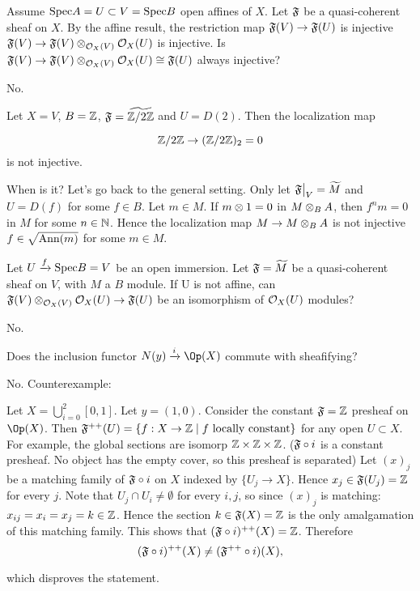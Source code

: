 \begin{question}
Assume $\Spec A = U \subset V = \Spec B$ open affines of $X$.
Let $\mathfrak{F}$ be a quasi-coherent sheaf on $X$.
By the affine result, the restriction map $\mathfrak{F}(V) \rightarrow \mathfrak{F}(U)$ is injective \iff $\mathfrak{F}(V) \rightarrow \mathfrak{F}(V)\otimes_{\mathcal{O}_X(V)}\mathcal{O}_X(U)$ is injective.
Is $\mathfrak{F}(V) \rightarrow \mathfrak{F}(V)\otimes_{\mathcal{O}_X(V)} \mathcal{O}_X(U) \cong \mathfrak{F}(U)$ always injective?
\end{question}
\begin{Qanswer}
No.

Let $X=V$, $B= \mathbb{Z}$, $\mathfrak{F}= \widetilde{\mathbb{Z}/2\mathbb{Z}}$ and $U= D(2)$.
Then the localization map 

\[ \mathbb{Z}/2\mathbb{Z} \rightarrow (\mathbb{Z}/2\mathbb{Z})_2 = 0\]
is not injective. 

\bigskip
When is it?
Let's go back to the general setting. 
Only let $\restr{\shf}{V}= \widetilde{M}$ and $U= D(f)$ for some $f \in B$.
Let $m\in M$. If $m \otimes 1 = 0$ in $M\otimes_B A$, then $f^n m = 0$ in $M$ for some $n\in \mathbb{N}$.
Hence the localization map $M\rightarrow M\otimes_B A$ is not injective \iff $f\in \sqrt{\mbox{Ann}(m)}$ for some $m\in M$.
\end{Qanswer}


\begin{question}
Let $U \xrightarrow{f} \Spec B = V$ be an open immersion.
Let $\mathfrak{F}=\widetilde{M}$ be a quasi-coherent sheaf on $V$, with $M$ a $B$ module. 
If U is not affine, can $\mathfrak{F}(V)\otimes_{\mathcal{O}_X(V)} \mathcal{O}_X(U) \rightarrow \mathfrak{F}(U)$ be an isomorphism of $\mathcal{O}_X(U)$ modules?
\end{question}
\begin{Qanswer}
No.
\end{Qanswer}


\begin{question}
Does the inclusion functor $N(y)\xrightarrow{i} \Op(X)$ commute with sheafifying?
\end{question}
\begin{Qanswer}
No. Counterexample: 

Let $X=\bigcup_{i=0}^2 [0,1]$. Let $y=(1,0)$. Consider the constant $\mathfrak{F}=\mathbb{Z}$ presheaf on $\Op(X)$. 
Then $\mathfrak{F}^{++}(U)=\{ f:X\rightarrow \mathbb{Z} \mid f \mbox{ locally constant}\}$ for any open $U\subset X$.
For example, the global sections are isomorp $\mathbb{Z}\times\mathbb{Z}\times \mathbb{Z}$.
($\mathfrak{F}\circ i$ is a constant presheaf. No object has the empty cover, so this presheaf is separated)
Let $(x)_j$ be a matching family of $\mathfrak{F}\circ i$ on $X$ indexed by $\{U_j\rightarrow X\}$.
Hence $x_j\in \mathfrak{F}(U_j)=\mathbb{Z}$ for every $j$. 
Note that $U_j\cap U_i \neq \emptyset$ for every $i,j$, so since $(x)_j$ is matching: $x_{ij} = x_i = x_j=k \in \mathbb{Z}$.
Hence the section $k\in \mathfrak{F}(X)=\mathbb{Z}$ is the only amalgamation of this matching family. This shows that $(\mathfrak{F}\circ i)^{++}(X)=\mathbb{Z}$.
Therefore 
\[(\mathfrak{F}\circ i)^{++}(X) \neq (\mathfrak{F}^{++} \circ i)(X),\]

which disproves the statement.

\end{Qanswer}


